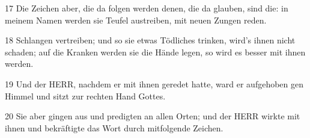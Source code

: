 \par 17 Die Zeichen aber, die da folgen werden denen, die da glauben, sind die: in meinem Namen werden sie Teufel austreiben, mit neuen Zungen reden.
\par 18 Schlangen vertreiben; und so sie etwas Tödliches trinken, wird's ihnen nicht schaden; auf die Kranken werden sie die Hände legen, so wird es besser mit ihnen werden.
\par 19 Und der HERR, nachdem er mit ihnen geredet hatte, ward er aufgehoben gen Himmel und sitzt zur rechten Hand Gottes.
\par 20 Sie aber gingen aus und predigten an allen Orten; und der HERR wirkte mit ihnen und bekräftigte das Wort durch mitfolgende Zeichen.

